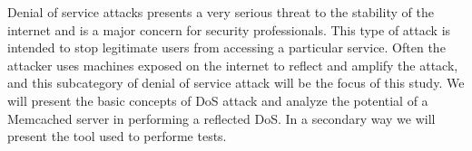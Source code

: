 Denial of service attacks presents a very serious threat to the stability of the internet and is a major concern for security professionals. This type of attack is intended to stop legitimate users from accessing a particular service. Often the attacker uses machines exposed on the internet to reflect and amplify the attack, and this subcategory of denial of service attack will be the focus of this study. We will present the basic concepts of DoS attack and analyze the potential of a Memcached server in performing a reflected DoS. In a secondary way we will present the tool used to performe tests.